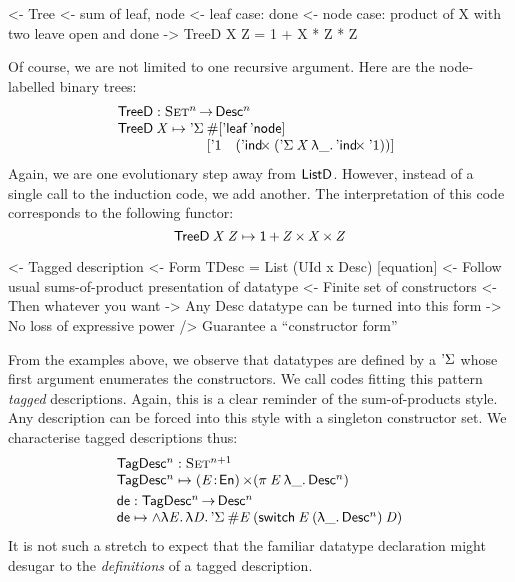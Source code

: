 \begin{wstructure}
<- Tree
    <- sum of leaf, node
    <- leaf case: done
    <- node case: product of X with two leave open and done
    -> TreeD X Z = 1 + X * Z * Z
\end{wstructure}

Of course, we are not limited to one recursive argument. Here are
the node-labelled binary trees:
%
\[\stk{
\TreeD : \Set^n \To \Desc^n \\
\begin{array}{@{}l@{}l}
\TreeD \: \V{X} \mapsto 
    \DSigma{ & \EnumT{\sqr{ \TreeLeaf\: \TreeNode }} \\}
           { & \sqr{ \DUnit \quad
                     (\DIndx{(\DSigma{\V{X}}{\LAM{\_}\DIndx{\DUnit}})})} }
\end{array}
}\]
%
Again, we are one evolutionary step away from $\ListD$. However,
instead of a single call to the induction code, we add another. The
interpretation of this code corresponds to the following functor:
%
\[    \TreeD\: \V{X}\: \V{Z} \mapsto \Unit \mathop{\D{+}} 
          \V{Z} \Prod \V{X}  \Prod \V{Z}     \]


\begin{wstructure}
<- Tagged description
    <- Form TDesc = List (UId x Desc) [equation]
    <- Follow usual sums-of-product presentation of datatype
        <- Finite set of constructors
        <- Then whatever you want
    -> Any Desc datatype can be turned into this form
        -> No loss of expressive power
        /> Guarantee a ``constructor form''
\end{wstructure}

From the examples above, we observe that datatypes are defined by a
$\SYMBDSigma$ whose first argument enumerates the constructors. We
call codes fitting this pattern \emph{tagged} descriptions. Again,
this is a clear reminder of the sum-of-products style. Any
description can be forced into this style with a singleton constructor
set. We characterise tagged descriptions thus:
\[\stk{
 \TagDesc^n : \Set^{n+1} \\
 \TagDesc^n \mapsto \SIGMA{\V{E}}{\EnumU} (\spi{\V{E}}{\LAM{\_} \Desc^n})
\smallskip\\
\SYMBtoDesc : \TagDesc^n \To \Desc^n \\
\SYMBtoDesc \mapsto
\spl{\LAM{\V{E}}\LAM{\V{D}}
\DSigma{\EnumT{\V{E}}}{(\F{switch}\:\V{E}\:(\LAM{\_}\Desc^n)\:\V{D})}}
}\]
It is not such a stretch to expect that the familiar datatype
declaration might desugar to the \emph{definitions} of a tagged description.

